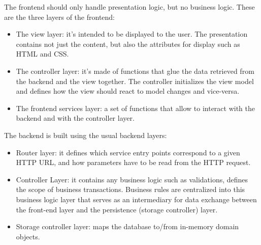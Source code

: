 \begin{legal}
\begin{legal}
				The frontend should only handle presentation logic, but no business logic. These are the three layers of the frontend:
				\begin{itemize}
					\item The view layer: it's intended to be displayed to the user. The presentation contains not just the content, but also the attributes for display such as HTML and CSS.
					\item The controller layer: it's made of functions that glue the data retrieved from the backend and the view together. The controller initializes the view model and defines how the view should react to model changes and vice-versa.
					\item The frontend services layer: a set of functions that allow to interact with the backend and with the controller layer.
				\end{itemize}
				The backend is built using the usual backend layers:
				\begin{itemize}
    				\item Router layer: it defines which service entry points correspond to a given HTTP URL, and how parameters have to be read from the HTTP request.
					\item Controller Layer: it contains any business logic such as validations, defines the scope of business transactions. Business rules are centralized into this business logic layer that serves as an intermediary for data exchange between the front-end layer and the persistence (storage controller) layer.
    				\item Storage controller layer: maps the database to/from in-memory domain objects.
				\end{itemize}
				\begin{figure}

\end{figure}
\end{legal}
\end{legal}
